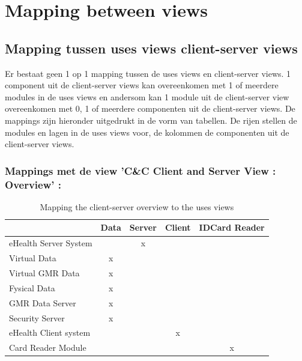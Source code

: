 \documentclass[a4paper,10pt]{article}
\begin{document}
\clearpage
\section{Mapping between views}
\label{Mappingbetweenviews}

\subsection{Mapping tussen uses views client-server views}
Er bestaat geen 1 op 1 mapping tussen de uses views en client-server views. 1 component uit de client-server views kan overeenkomen met 1 of meerdere modules in de uses views en andersom kan 1 module uit de client-server view overeenkomen met 0, 1 of meerdere componenten uit de client-server views.  De mappings zijn hieronder uitgedrukt in de vorm van tabellen. De rijen stellen de modules en lagen in de uses views voor, de kolommen de componenten uit de client-server views. 

\subsubsection*{Mappings met de view 'C\&C Client and Server View : Overview' :}
\begin{table}[h!]
\begin{center}
 \begin{tabular}{l|c|c|c|c|} 
 & Data & Server & Client & IDCard Reader\\ \hline
eHealth Server System & & x & & \\ \hline
\hspace{6pt}Virtual Data & x & & & \\ \hline
\hspace{12pt}Virtual GMR Data & x & & & \\ \hline
\hspace{6pt}Fysical Data & x & & & \\ \hline
\hspace{12pt}GMR Data Server & x & & & \\ \hline
\hspace{12pt}Security Server & x & & & \\ \hline
eHealth Client system & & & x & \\ \hline
\hspace{6pt}Card Reader Module & & & & x \\ \hline
\end{tabular}
\caption{Mapping the client-server overview to the uses views}
\end{center}
\end{table}
\end{document}
